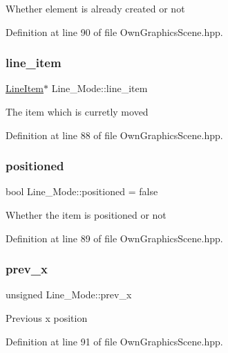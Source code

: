 Whether element is already created or not 

Definition at line 90 of file Own\+Graphics\+Scene.\+hpp.

\mbox{\label{structLine__Mode_a4e11b31f28505579f3dfcde54b27ecac}} 
\subsubsection{\texorpdfstring{line\+\_\+item}{line\_item}}
{\footnotesize\ttfamily \mbox{\hyperlink{classLineItem}{Line\+Item}}$\ast$ Line\+\_\+\+Mode\+::line\+\_\+item}

The item which is curretly moved 

Definition at line 88 of file Own\+Graphics\+Scene.\+hpp.

\mbox{\label{structLine__Mode_aefbb8555f406d47d742491003a6afde1}} 
\subsubsection{\texorpdfstring{positioned}{positioned}}
{\footnotesize\ttfamily bool Line\+\_\+\+Mode\+::positioned = false}

Whether the item is positioned or not 

Definition at line 89 of file Own\+Graphics\+Scene.\+hpp.

\mbox{\label{structLine__Mode_a8bbcbaff29a7810e066e99174e562371}} 
\subsubsection{\texorpdfstring{prev\+\_\+x}{prev\_x}}
{\footnotesize\ttfamily unsigned Line\+\_\+\+Mode\+::prev\+\_\+x}

Previous x position 

Definition at line 91 of file Own\+Graphics\+Scene.\+hpp.

\mbox{\label{structLine__Mode_a8d5fb940f686955ead3f368a8d3b9016}} 
